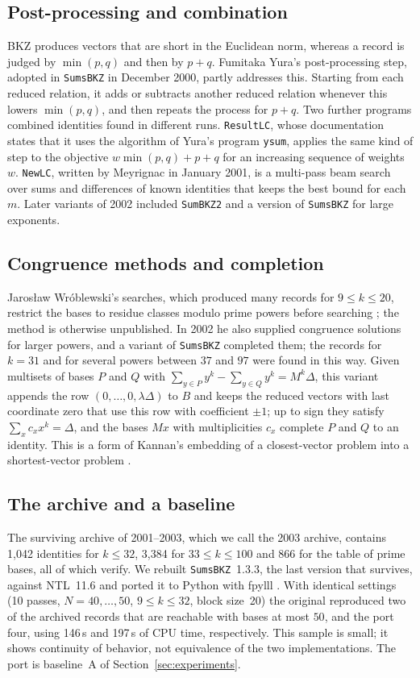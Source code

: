 \documentclass[11pt]{amsart}
\theoremstyle{definition}
\theoremstyle{remark}
\begin{document}
\subsection{Post-processing and combination}
BKZ produces vectors that are short in the Euclidean norm, whereas a record is judged by
$\min(p,q)$ and then by $p+q$. Fumitaka Yura's post-processing step, adopted in
\texttt{SumsBKZ} in December 2000, partly addresses this. Starting from each reduced
relation, it adds or subtracts another reduced relation whenever this lowers $\min(p,q)$, and
then repeats the process for $p+q$. Two further programs combined identities found in
different runs. \texttt{ResultLC}, whose documentation states that it uses the algorithm of Yura's
program \texttt{ysum}, applies the same kind of step to the objective
$w\min(p,q)+p+q$ for an increasing sequence of weights $w$. \texttt{NewLC}, written by Meyrignac in
January 2001, is a multi-pass beam search over sums and differences of known identities that
keeps the best bound for each $m$. Later variants of 2002 included \texttt{SumBKZ2} and a version
of \texttt{SumsBKZ} for large exponents.

\subsection{Congruence methods and completion}
Jaros\l aw Wr\'oblewski's searches, which produced many records for $9\le k\le20$, restrict
the bases to residue classes modulo prime powers before searching
\cite{WroblewskiProblemSet}; the method is otherwise unpublished. In 2002 he also supplied
congruence solutions for larger powers, and a variant of \texttt{SumsBKZ} completed them; the
records for $k=31$ and for several powers between $37$ and $97$ were found in this way. Given
multisets of bases $P$ and $Q$ with $\sum_{y\in P}y^k-\sum_{y\in Q}y^k=M^k\Delta$, this variant
appends the row $(0,\dots,0,\lambda\Delta)$ to $B$ and keeps the reduced vectors with last
coordinate zero that use this row with coefficient $\pm1$; up to sign they satisfy
$\sum_xc_xx^k=\Delta$, and the bases $Mx$ with multiplicities $c_x$ complete $P$ and $Q$ to an
identity. This is a form of Kannan's embedding of a closest-vector problem into a
shortest-vector problem \cite{Kannan1987}.

\subsection{The archive and a baseline}
The surviving archive of 2001--2003, which we call the 2003 archive, contains 1,042 identities
for $k\le32$, 3,384 for $33\le k\le100$ and 866 for the table of prime bases, all of which
verify. We rebuilt \texttt{SumsBKZ}~1.3.3, the last version that survives, against NTL~11.6 and
ported it to Python with fpylll \cite{fpylll}. With identical settings (10 passes,
$N=40,\dots,50$, $9\le k\le32$, block size~20) the original reproduced two of the archived
records that are reachable with bases at most $50$, and the port four, using 146\,s and 197\,s
of CPU time, respectively. This sample is small; it shows continuity of behavior, not
equivalence of the two implementations. The port is baseline~A of
Section~\ref{sec:experiments}.
\end{document}
